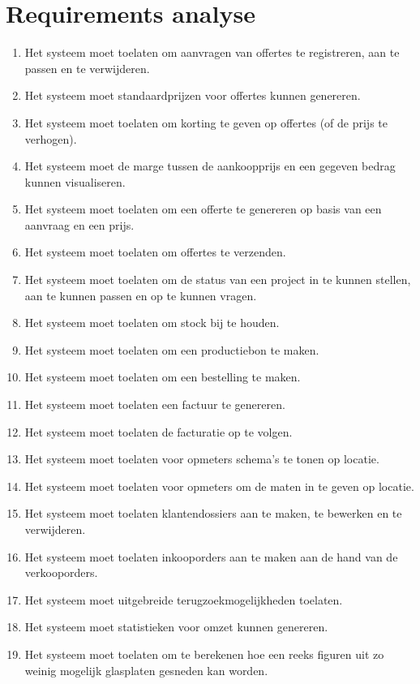 \documentclass[a4paper]{article}
\begin{document}
\section{Requirements analyse}
\begin{enumerate}
	\item Het systeem moet toelaten om aanvragen van offertes te registreren, aan te passen en te verwijderen.
	\item Het systeem moet standaardprijzen voor offertes kunnen genereren.
	\item Het systeem moet toelaten om korting te geven op offertes (of de prijs te verhogen).
	\item Het systeem moet de marge tussen de aankoopprijs en een gegeven bedrag kunnen visualiseren.
	\item Het systeem moet toelaten om een offerte te genereren op basis van een aanvraag en een prijs.
	\item Het systeem moet toelaten om offertes te verzenden.
	\item Het systeem moet toelaten om de status van een project in te kunnen stellen, aan te kunnen passen en op te kunnen vragen.
	\item Het systeem moet toelaten om stock bij te houden.
	\item Het systeem moet toelaten om een productiebon te maken.
	\item Het systeem moet toelaten om een bestelling te maken.
	\item Het systeem moet toelaten een factuur te genereren.
	\item Het systeem moet toelaten de facturatie op te volgen.
	\item Het systeem moet toelaten voor opmeters schema's te tonen op locatie.
	\item Het systeem moet toelaten voor opmeters om de maten in te geven op locatie.
	\item Het systeem moet toelaten klantendossiers aan te maken, te bewerken en te verwijderen.
    \item Het systeem moet toelaten inkooporders aan te maken aan de hand van de verkooporders.
    \item Het systeem moet uitgebreide terugzoekmogelijkheden toelaten.
    \item Het systeem moet statistieken voor omzet kunnen genereren.
    \item Het systeem moet toelaten om te berekenen hoe een reeks figuren uit zo weinig mogelijk glasplaten gesneden kan worden. 
\end{enumerate}
\end{document}
